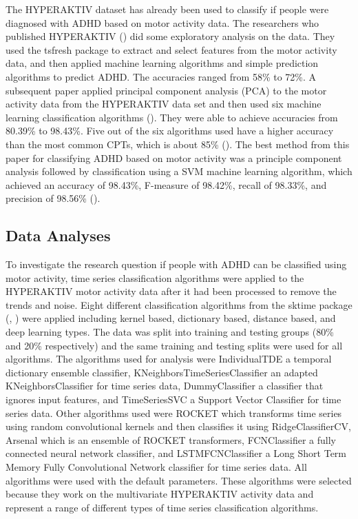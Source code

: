 \documentclass[,article,,moreauthors,pdftex]{mdpi}
\begin{document}
The HYPERAKTIV dataset has already been used to classify if people were
diagnosed with ADHD based on motor activity data. The researchers who
published HYPERAKTIV (\citet{10.1145/3458305.3478454}) did some
exploratory analysis on the data. They used the tsfresh package to
extract and select features from the motor activity data, and then
applied machine learning algorithms and simple prediction algorithms to
predict ADHD. The accuracies ranged from 58\% to 72\%. A subsequent
paper applied principal component analysis (PCA) to the motor activity
data from the HYPERAKTIV data set and then used six machine learning
classification algorithms (\citet{kaur_accurate_2022}). They were able
to achieve accuracies from 80.39\% to 98.43\%. Five out of the six
algorithms used have a higher accuracy than the most common CPTs, which
is about 85\% (\citet{gualtieri_adhd_2005}). The best method from this
paper for classifying ADHD based on motor activity was a principle
component analysis followed by classification using a SVM machine
learning algorithm, which achieved an accuracy of 98.43\%, F-measure of
98.42\%, recall of 98.33\%, and precision of 98.56\%
(\citet{kaur_accurate_2022}).

\hypertarget{data-analyses}{%
\subsection{Data Analyses}\label{data-analyses}}

To investigate the research question if people with ADHD can be
classified using motor activity, time series classification algorithms
were applied to the HYPERAKTIV motor activity data after it had been
processed to remove the trends and noise. Eight different classification
algorithms from the sktime package (\citet{loning_sktime_nodate},
\citet{loning_sktimesktime_2022}) were applied including kernel based,
dictionary based, distance based, and deep learning types. The data was
split into training and testing groups (80\% and 20\% respectively) and
the same training and testing splits were used for all algorithms. The
algorithms used for analysis were IndividualTDE a temporal dictionary
ensemble classifier, KNeighborsTimeSeriesClassifier an adapted
KNeighborsClassifier for time series data, DummyClassifier a classifier
that ignores input features, and TimeSeriesSVC a Support Vector
Classifier for time series data. Other algorithms used were ROCKET which
transforms time series using random convolutional kernels and then
classifies it using RidgeClassifierCV, Arsenal which is an ensemble of
ROCKET transformers, FCNClassifier a fully connected neural network
classifier, and LSTMFCNClassifier a Long Short Term Memory Fully
Convolutional Network classifier for time series data. All algorithms
were used with the default parameters. These algorithms were selected
because they work on the multivariate HYPERAKTIV activity data and
represent a range of different types of time series classification
algorithms.
\end{document}
